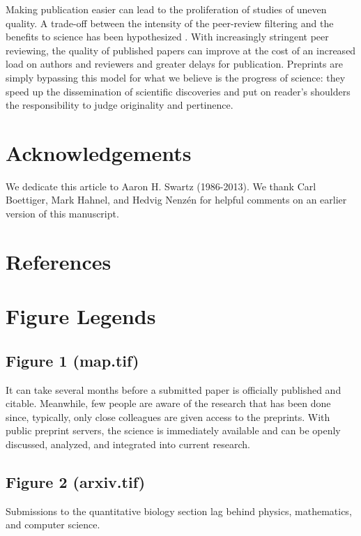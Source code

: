 \documentclass[10pt]{article}
\begin{document}
Making publication easier can lead to the proliferation of studies of uneven 
quality. A trade-off between the intensity of the peer-review filtering and 
the benefits to science has been hypothesized \cite{Aarssen2012}.  With 
increasingly stringent peer reviewing, the quality of published papers can 
improve at the cost of an increased load on authors and 
reviewers and greater delays for publication.  Preprints are simply 
bypassing this model for what we believe is the progress of science: they 
speed up the dissemination of scientific discoveries and put on reader's 
shoulders the responsibility to judge originality and pertinence.

\section*{Acknowledgements}

We dedicate this article to Aaron H. Swartz (1986-2013).  We thank Carl
Boettiger, Mark Hahnel, and Hedvig Nenz\'en for helpful comments on an earlier
version of this manuscript.

\section*{References}


\newpage
\section*{Figure Legends}

\subsection*{Figure 1 (map.tif)}

It can take several months before a submitted paper is officially published and
citable. Meanwhile, few people are aware of the research that has been done
since, typically, only close colleagues are given access to the preprints. With
public preprint servers, the science is immediately available and can be openly
discussed, analyzed, and integrated into current research.

\subsection*{Figure 2 (arxiv.tif)}

Submissions to the quantitative biology section lag behind
physics, mathematics, and computer science.
\end{document}
